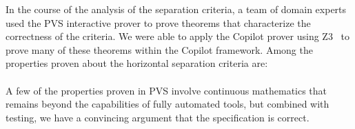 In the course of the analysis of the separation criteria, a team of
domain experts used the PVS interactive prover to prove theorems that
characterize the correctness of the criteria.  We were able to apply
the Copilot prover using Z3~\cite{DeMoura2008} to prove many of these theorems
within the Copilot framework. Among the properties proven about the
horizontal separation criteria are:


 \vspace{\belowdisplayskip}

\noindent 
\paragraph{}A few of the properties proven in PVS involve continuous mathematics
that remains beyond the capabilities of fully automated tools,
but combined with testing, we have a convincing argument that the
specification is correct. 


%
%




